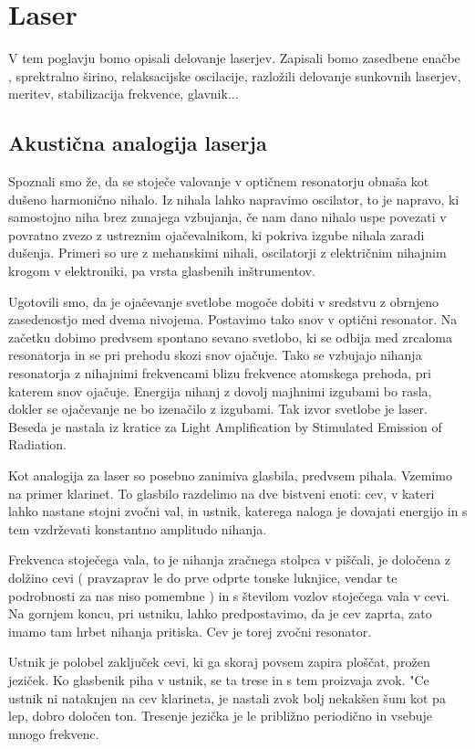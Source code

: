 \chapter{Laser}

V tem poglavju bomo opisali delovanje laserjev. Zapisali bomo zasedbene enačbe
, sprektralno širino, relaksacijske oscilacije, razložili delovanje sunkovnih
laserjev, meritev, stabilizacija frekvence, glavnik...

\section{Akustična analogija laserja}

Spoznali smo že, da se stoječe valovanje v optičnem resonatorju obnaša kot 
dušeno harmonično nihalo. Iz nihala lahko napravimo oscilator, to je 
napravo, ki samostojno niha brez zunajega vzbujanja, če nam dano nihalo uspe povezati v
povratno zvezo z ustreznim ojačevalnikom, ki pokriva izgube nihala zaradi
dušenja. Primeri so ure z mehanskimi nihali, oscilatorji z električnim
nihajnim krogom v elektroniki, pa vrsta glasbenih inštrumentov.

Ugotovili smo, da je ojačevanje svetlobe mogoče dobiti v sredstvu z
obrnjeno zasedenostjo med dvema nivojema. Postavimo tako snov v optični
resonator. Na začetku dobimo predvsem spontano sevano svetlobo, ki se
odbija med zrcaloma resonatorja in se pri prehodu skozi snov ojačuje. Tako
se vzbujajo nihanja resonatorja z nihajnimi frekvencami blizu frekvence
atomskega prehoda, pri katerem snov ojačuje. Energija nihanj z dovolj
majhnimi izgubami bo rasla, dokler se ojačevanje ne bo izenačilo z
izgubami. Tak izvor svetlobe je laser. Beseda je nastala iz kratice za Light
Amplification by Stimulated Emission of Radiation.

Kot analogija za laser so posebno zanimiva glasbila, predvsem pihala.
Vzemimo na primer klarinet. To glasbilo razdelimo na dve bistveni enoti:
cev, v kateri lahko nastane stojni zvočni val, in ustnik, katerega naloga
je dovajati energijo in s tem vzdrževati konstantno amplitudo nihanja.

Frekvenca stoječega vala, to je nihanja zračnega stolpca v piščali, je
določena z dolžino cevi ( pravzaprav le do prve odprte tonske luknjice,
vendar te podrobnosti za nas niso pomembne ) in s številom vozlov
stoječega vala v cevi. Na gornjem koncu, pri ustniku, lahko predpostavimo,
da je cev zaprta, zato imamo tam hrbet nihanja pritiska. Cev je torej
zvočni resonator.

Ustnik je polobel zaključek cevi, ki ga skoraj povsem zapira ploščat,
prožen jeziček. Ko glasbenik piha v ustnik, se ta trese in s tem proizvaja
zvok. "Ce ustnik ni nataknjen na cev klarineta, je nastali zvok bolj
nekakšen šum kot pa lep, dobro določen ton. Tresenje jezička je le
približno periodično in vsebuje mnogo frekvenc.

